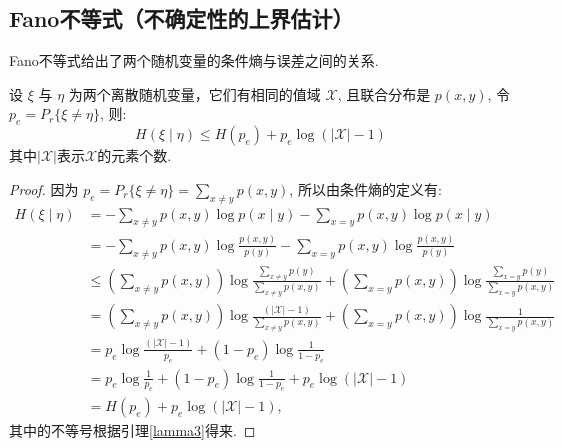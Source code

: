 \subsection{Fano不等式（不确定性的上界估计）}
Fano不等式给出了两个随机变量的条件熵与误差之间的关系.
\begin{theorem}[Fano不等式]
     设 $ \xi $ 与 $ \eta $ 为两个离散随机变量，它们有相同的值域 $ \mathscr{X} $, 且联合分布是 $ p(x, y) $, 令 $ p_{e}=P_r\{\xi \neq \eta\} $, 则:
$$
H(\xi \mid \eta) \leqslant H\left(p_{e}\right)+p_{e} \log (|\mathscr{X}|-1)
$$
其中$|\mathscr{X}|$表示$\mathscr{X}$的元素个数.
\end{theorem}
\begin{proof}
    因为 $ p_{e}=P_r\{\xi \neq \eta\}=\sum\limits_{x \neq y} p(x, y) $,
所以由条件熵的定义有:
$$
\begin{aligned}
H(\xi \mid \eta) & =-\sum_{x \neq y} p(x, y) \log p(x \mid y)-\sum_{x=y} p(x, y) \log p(x \mid y) \\
& =-\sum_{x \neq y} p(x, y) \log \frac{p(x, y)}{p(y)}-\sum_{x=y} p(x, y) \log \frac{p(x, y)}{p(y)} \\
& \leqslant\left(\sum\limits_{x \neq y} p(x, y)\right) \log \frac{\sum\limits_{x \neq y} p(y)}{\sum\limits_{x \neq y} p(x, y)}+\left(\sum_{x=y} p(x, y)\right) \log \frac{\sum\limits_{x=y} p(y)}{\sum\limits_{x=y} p(x, y)} \\
& =\left(\sum\limits_{x \neq y} p(x, y)\right) \log \frac{(|\mathscr{X}|-1)}{\sum\limits_{x \neq y} p(x, y)}+\left(\sum_{x=y} p(x, y)\right) \log \frac{1}{\sum\limits_{x=y} p(x, y)} \\
& =p_{e} \log \frac{(|\mathscr{X}|-1)}{p_{e}}+\left(1-p_{e}\right) \log \frac{1}{1-p_{e}} \\
& =p_{e} \log \frac{1}{p_{e}}+\left(1-p_{e}\right) \log \frac{1}{1-p_{e}}+p_{e} \log (|\mathscr{X}|-1) \\
& =H\left(p_{e}\right)+p_{e} \log (|\mathscr{X}|-1),
\end{aligned}
$$
其中的不等号根据引理\ref{lamma3}得来.
\end{proof}











